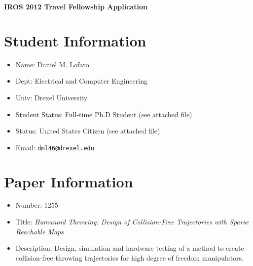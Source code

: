 \documentclass[11pt,a4paper,oneside]{report}
\begin{document}
\begin{center}
\LARGE{ \bf IROS 2012 Travel Fellowship Application }
\end{center}

\section*{Student Information}
\begin{itemize}
\item Name: Daniel M. Lofaro
\item Dept: Electrical and Computer Engineering
\item Univ: Drexel University
\item Student Status: Full-time Ph.D Student (see attached file)
\item Status: United States Citizen (see attached file)
\item Email: \tt{dml46@drexel.edu}
\end{itemize}


\section*{Paper Information}
\begin{itemize}
\item Number: 1255
\item Title: \textit{Humanoid Throwing: Design of Collision-Free Trajectories with Sparse Reachable Maps}
\item Description: Design, simulation and hardware testing of a method to create collision-free throwing trajectories for high degree of freedom manipulators. 
\end{itemize}
\end{document}
